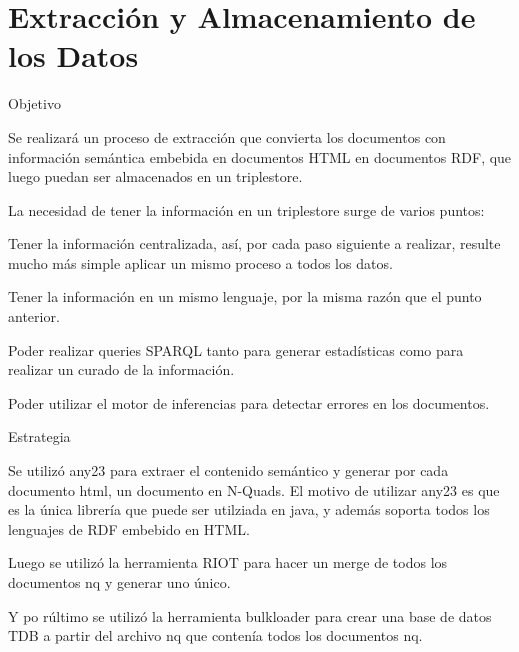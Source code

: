 \chapter{Extracción y Almacenamiento de los Datos}
\label{chapter:extraccion}

Objetivo

Se realizará un proceso de extracción que convierta los documentos con información semántica embebida en documentos HTML en documentos RDF, que luego puedan ser 
almacenados en un triplestore.

La necesidad de tener la información en un triplestore surge de varios puntos:

Tener la información centralizada, así, por cada paso siguiente a realizar, resulte mucho más simple aplicar un mismo proceso a todos los datos.

Tener la información en un mismo lenguaje, por la misma razón que el punto anterior.

Poder realizar queries SPARQL tanto para generar estadísticas como para realizar un curado de la información.

Poder utilizar el motor de inferencias para detectar errores en los documentos.

Estrategia

Se utilizó any23 para extraer el contenido semántico  y generar por cada documento html, un documento en N-Quads.
El motivo de utilizar any23 es que es la única librería que puede ser utilziada en java, y además soporta todos los lenguajes de RDF embebido en HTML.


Luego se utilizó la herramienta RIOT para hacer un merge de todos los documentos nq y generar uno único.

Y po rúltimo se utilizó la herramienta bulkloader para crear una base de datos TDB a partir del archivo nq que contenía todos los documentos nq.
